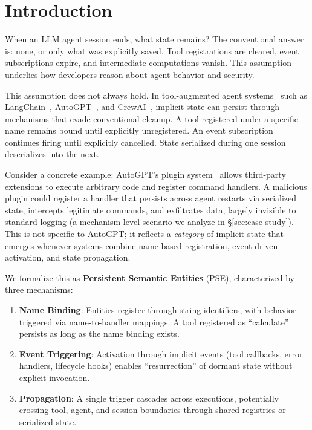 \documentclass{article}
\theoremstyle{plain}
\theoremstyle{definition}
\newcommand{\pse}{\textsc{PSE}}
\begin{document}
\section{Introduction}
\label{sec:intro}

When an LLM agent session ends, what state remains? The conventional answer is: none, or only what was explicitly saved. Tool registrations are cleared, event subscriptions expire, and intermediate computations vanish. This assumption underlies how developers reason about agent behavior and security.

This assumption does not always hold. In tool-augmented agent systems~\cite{schick2023toolformer,qin2023toolllm} such as LangChain~\cite{langchain2023}, AutoGPT~\cite{autogpt2023}, and CrewAI~\cite{crewai2024}, implicit state can persist through mechanisms that evade conventional cleanup. A tool registered under a specific name remains bound until explicitly unregistered. An event subscription continues firing until explicitly cancelled. State serialized during one session deserializes into the next.

Consider a concrete example: AutoGPT's plugin system~\cite{autogpt2023} allows third-party extensions to execute arbitrary code and register command handlers. A malicious plugin could register a handler that persists across agent restarts via serialized state, intercepts legitimate commands, and exfiltrates data, largely invisible to standard logging (a mechanism-level scenario we analyze in \S\ref{sec:case-study}). This is not specific to AutoGPT; it reflects a \emph{category} of implicit state that emerges whenever systems combine name-based registration, event-driven activation, and state propagation.

We formalize this as \textbf{Persistent Semantic Entities} (\pse{}), characterized by three mechanisms:
\begin{enumerate}
    \item \textbf{Name Binding}: Entities register through string identifiers, with behavior triggered via name-to-handler mappings. A tool registered as ``calculate'' persists as long as the name binding exists.
    \item \textbf{Event Triggering}: Activation through implicit events (tool callbacks, error handlers, lifecycle hooks) enables ``resurrection'' of dormant state without explicit invocation.
    \item \textbf{Propagation}: A single trigger cascades across executions, potentially crossing tool, agent, and session boundaries through shared registries or serialized state.
\end{enumerate}
\end{document}
